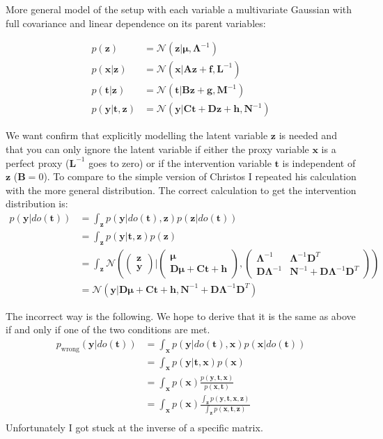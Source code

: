 \documentclass{article}
\newcommand{\bA}{\mathbf{A}}
\newcommand{\bB}{\mathbf{B}}
\newcommand{\bC}{\mathbf{C}}
\newcommand{\bD}{\mathbf{D}}
\newcommand{\f}{\mathbf{f}}
\newcommand{\bg}{\mathbf{g}}
\newcommand{\bh}{\mathbf{h}}
\newcommand{\bL}{\mathbf{L}}
\newcommand{\bM}{\mathbf{M}}
\newcommand{\bN}{\mathbf{N}}
\newcommand{\Norm}{\mathcal{N}}
\newcommand{\bt}{\mathbf{t}}
\newcommand{\bx}{\mathbf{x}}
\newcommand{\by}{\mathbf{y}}
\newcommand{\bz}{\mathbf{z}}
\newcommand{\bmu}{\boldsymbol{\mu}}
\newcommand{\bLam}{\boldsymbol{\Lambda}}
\newcommand{\inv}{^{-1}}
\newcommand{\twovec}[2]{\begin{pmatrix} #1 \\ #2 \end{pmatrix}}
\begin{document}
\noindent
More general model of the setup with each variable a multivariate Gaussian with full covariance and linear dependence on its parent variables:

\begin{align}
p(\bz) &= \Norm(\bz | \bmu, \bLam\inv)\\
p(\bx|\bz) &= \Norm(\bx | \bA\bz + \f, \bL\inv)\\
p(\bt|\bz) &= \Norm(\bt|\bB\bz + \bg, \bM\inv)\\
p(\by|\bt, \bz) &= \Norm(\by |\bC\bt + \bD\bz + \bh , \bN\inv)
\end{align}

\noindent
We want confirm that explicitly modelling the latent variable $\bz$ is needed and that you can only ignore the latent variable if either the proxy variable $\bx$ is a perfect proxy ($\bL^{-1}$ goes to zero) or if the intervention variable $\bt$ is independent of $\bz$ ($\bB=0$). To compare to the simple version of Christos I repeated his calculation with the more general distribution.
The correct calculation to get the intervention distribution is:
\begin{equation}
\begin{split}
    p(\by|do(\bt)) &= \int_\bz p(\by |do(\bt), \bz) p(\bz|do(\bt))\\
    &=\int_\bz p(\by |\bt, \bz) p(\bz)\\
    &=\int_\bz \Norm(\twovec{\bz}{\by} | \twovec{\bmu}{\bD\bmu + \bC\bt + \bh}, \begin{pmatrix}
    \bLam\inv & \bLam\inv\bD^T \\ \bD\bLam\inv & \bN\inv + \bD\bLam\inv\bD^T\end{pmatrix})\\
    &= \Norm(\by | \bD\bmu + \bC\bt + \bh , \bN\inv + \bD\bLam\inv\bD^T)
\end{split}
\end{equation}

\noindent
The incorrect way is the following. We hope to derive that it is the same as above if and only if one of the two conditions are met.
\begin{equation}
\begin{split}
    p_{\text{wrong}}(\by | do(\bt)) &= \int_\bx p(\by |do(\bt), \bx) p(\bx|do(\bt))\\
    &= \int_\bx p(\by |\bt, \bx) p(\bx)\\
    &= \int_\bx p(\bx) \frac{p(\by, \bt, \bx)}{p(\bx, \bt)}\\
    &= \int_\bx p(\bx) \frac{\int_\bz p(\by, \bt, \bx, \bz)}{\int_\bz p(\bx, \bt, \bz)}\\
\end{split}
\end{equation}
Unfortunately I got stuck at the inverse of a specific matrix. 
\end{document}
